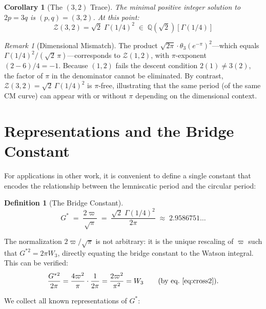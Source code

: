 \documentclass[12pt]{article}
\newtheorem{corollary}[theorem]{Corollary}
\theoremstyle{definition}
\newtheorem{definition}[theorem]{Definition}
\theoremstyle{remark}
\newtheorem{remark}[theorem]{Remark}
\begin{document}
\begin{corollary}[The $(3,2)$ Trace]
The minimal positive integer solution to $2p = 3q$ is $(p,q) = (3,2)$. At this point:
\begin{equation}
    \mathcal{Z}(3,2) = \sqrt{2}\;\Gamma(1/4)^2 \;\in\; \mathbb{Q}(\sqrt{2})[\Gamma(1/4)]
\end{equation}
\end{corollary}

\begin{remark}[Dimensional Mismatch]
\label{rmk:mismatch}
The product $\sqrt{2\pi}\cdot\theta_3(e^{-\pi})^2$---which equals $\Gamma(1/4)^2/(\sqrt{2}\,\pi)$---corresponds to $\mathcal{Z}(1,2)$, with $\pi$-exponent $(2-6)/4 = -1$. Because $(1,2)$ fails the descent condition $2(1) \neq 3(2)$, the factor of $\pi$ in the denominator cannot be eliminated. By contrast, $\mathcal{Z}(3,2) = \sqrt{2}\,\Gamma(1/4)^2$ is $\pi$-free, illustrating that the same period (of the same CM curve) can appear with or without $\pi$ depending on the dimensional context.
\end{remark}

\section{Representations and the Bridge Constant}
\label{sec:representations}

For applications in other work, it is convenient to define a single constant that encodes the relationship between the lemniscatic period and the circular period:

\begin{definition}[The Bridge Constant]
\begin{equation}
    G^* \;=\; \frac{2\varpi}{\sqrt{\pi}} \;=\; \frac{\sqrt{2}\;\Gamma(1/4)^2}{2\pi} \;\approx\; 2.9586751\ldots
    \label{eq:gstar}
\end{equation}
\end{definition}

The normalization $2\varpi/\sqrt{\pi}$ is not arbitrary: it is the unique rescaling of $\varpi$ such that $G^{*2} = 2\pi W_3$, directly equating the bridge constant to the Watson integral. This can be verified:
\[
    \frac{G^{*2}}{2\pi} = \frac{4\varpi^2}{\pi}\cdot\frac{1}{2\pi} = \frac{2\varpi^2}{\pi^2} = W_3 \qquad\text{(by eq.~\eqref{eq:cross2})}.
\]

We collect all known representations of $G^*$:
\end{document}
